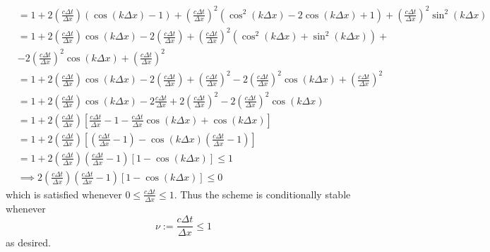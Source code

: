 \documentclass{article}
\begin{document}
\begin{itemize}
\begin{align*}
        &= 1 + 2\left(\frac{c\Delta t}{\Delta x}\right)(\cos(k\Delta x) - 1) + \left(\frac{c\Delta t}{\Delta x}\right)^2(\cos^2(k\Delta x) - 2\cos(k\Delta x) + 1) + \left(\frac{c\Delta t}{\Delta x}\right)^2\sin^2(k\Delta x)\\
        &= 1 + 2\left(\frac{c\Delta t}{\Delta x}\right)\cos(k\Delta x) - 2\left(\frac{c\Delta t}{\Delta x}\right) + \left(\frac{c\Delta t}{\Delta x}\right)^2(\cos^2(k\Delta x) + \sin^2(k \Delta x)) + \\
        &- 2\left(\frac{c\Delta t}{\Delta x}\right)^2\cos(k\Delta x) + \left(\frac{c\Delta t}{\Delta x}\right)^2\\
        &= 1 + 2\left(\frac{c\Delta t}{\Delta x}\right)\cos(k\Delta x) - 2\left(\frac{c\Delta t}{\Delta x}\right) + \left(\frac{c\Delta t}{\Delta x}\right)^2 - 2\left(\frac{c \Delta t}{\Delta x}\right)^2\cos(k\Delta x) + \left(\frac{c\Delta t}{\Delta x}\right)^2\\
        &= 1 + 2\left(\frac{c\Delta t}{\Delta x}\right)\cos(k\Delta x) - 2\frac{c\Delta t}{\Delta x} + 2\left(\frac{c\Delta t}{\Delta x}\right)^2 - 2\left(\frac{c\Delta t}{\Delta x}\right)^2\cos(k\Delta x)\\
        &= 1 + 2\left(\frac{c\Delta t}{\Delta x}\right)\left[\frac{c\Delta t}{\Delta x} - 1 - \frac{c\Delta t}{\Delta x}\cos(k\Delta x) + \cos(k\Delta x)\right]\\
        &= 1 + 2\left(\frac{c\Delta t}{\Delta x}\right)\left[\left(\frac{c\Delta t}{\Delta x} - 1\right) - \cos(k\Delta x)\left(\frac{c\Delta t}{\Delta x} - 1\right)\right]\\
        &= 1 + 2\left(\frac{c\Delta t}{\Delta x}\right)\left(\frac{c\Delta t}{\Delta x} - 1\right)[1 - \cos(k\Delta x)] \leq 1\\
        &\implies 2\left(\frac{c\Delta t}{\Delta x}\right)\left(\frac{c\Delta t}{\Delta x} - 1\right)[1 - \cos(k\Delta x)] \leq 0
    \end{align*}
    which is satisfied whenever $0 \leq \frac{c\Delta t}{\Delta x} \leq 1$. Thus the scheme is conditionally stable whenever
    \[\nu := \frac{c\Delta t}{\Delta x} \leq 1\]
    as desired.



    \pagebreak
\end{itemize} 
\end{document}
